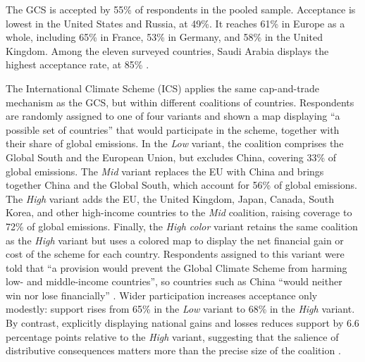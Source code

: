 The GCS is accepted by 55\% of respondents in the pooled sample. Acceptance is lowest in the United States and Russia, at 49\%. It reaches 61\% in Europe as a whole, including 65\% in France, 53\% in Germany, and 58\% in the United Kingdom. Among the eleven surveyed countries, Saudi Arabia displays the highest acceptance rate, at 85\% \citep[Figures 6 \& S30]{fabre_public_2026}.



The International Climate Scheme (ICS) applies the same cap-and-trade mechanism as the GCS, but within different coalitions of countries. Respondents are randomly assigned to one of four variants and shown a map displaying ``a possible set of countries'' that would participate in the scheme, together with their share of global emissions. In the \textit{Low} variant, the coalition comprises the Global South and the European Union, but excludes China, covering 33\% of global emissions. The \textit{Mid} variant replaces the EU with China and brings together China and the Global South, which account for 56\% of global emissions. The \textit{High} variant adds the EU, the United Kingdom, Japan, Canada, South Korea, and other high-income countries to the \textit{Mid} coalition, raising coverage to 72\% of global emissions. Finally, the \textit{High color} variant retains the same coalition as the \textit{High} variant but uses a colored map to display the net financial gain or cost of the scheme for each country. Respondents assigned to this variant were told that ``a provision would prevent the Global Climate Scheme from harming low- and middle-income countries'', so countries such as China ``would neither win nor lose financially'' \citep[Questions 31--35 and Figure 5]{fabre_public_2026}. Wider participation increases acceptance only modestly: support rises from 65\% in the \textit{Low} variant to 68\% in the \textit{High} variant. By contrast, explicitly displaying national gains and losses reduces support by 6.6 percentage points relative to the \textit{High} variant, suggesting that the salience of distributive consequences matters more than the precise size of the coalition \citep[Figure 6]{fabre_public_2026}.


